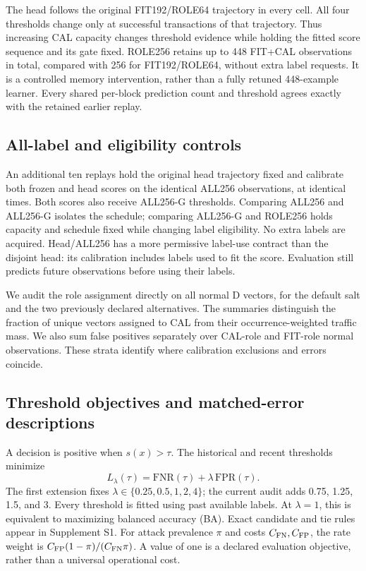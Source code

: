 The head follows the original FIT192/ROLE64 trajectory in every cell. All four thresholds change only at successful transactions of that trajectory. Thus increasing CAL capacity changes threshold evidence while holding the fitted score sequence and its gate fixed. ROLE256 retains up to 448 FIT+CAL observations in total, compared with 256 for FIT192/ROLE64, without extra label requests. It is a controlled memory intervention, rather than a fully retuned 448-example learner. Every shared per-block prediction count and threshold agrees exactly with the retained earlier replay.

\subsection{All-label and eligibility controls}
An additional ten replays hold the original head trajectory fixed and calibrate both frozen and head scores on the identical ALL256 observations, at identical times. Both scores also receive ALL256-G thresholds. Comparing ALL256 and ALL256-G isolates the schedule; comparing ALL256-G and ROLE256 holds capacity and schedule fixed while changing label eligibility. No extra labels are acquired. Head/ALL256 has a more permissive label-use contract than the disjoint head: its calibration includes labels used to fit the score. Evaluation still predicts future observations before using their labels.

We audit the role assignment directly on all normal D vectors, for the default salt and the two previously declared alternatives. The summaries distinguish the fraction of unique vectors assigned to CAL from their occurrence-weighted traffic mass. We also sum false positives separately over CAL-role and FIT-role normal observations. These strata identify where calibration exclusions and errors coincide.

\subsection{Threshold objectives and matched-error descriptions}
A decision is positive when $s(x)>\tau$. The historical and recent thresholds minimize
\begin{equation}
 L_\lambda(\tau)=\mathrm{FNR}(\tau)+\lambda\,\mathrm{FPR}(\tau).
 \label{eq:cost}
\end{equation}
The first extension fixes $\lambda\in\{0.25,0.5,1,2,4\}$; the current audit adds 0.75, 1.25, 1.5, and 3. Every threshold is fitted using past available labels. At $\lambda=1$, this is equivalent to maximizing balanced accuracy (BA). Exact candidate and tie rules appear in Supplement S1. For attack prevalence $\pi$ and costs $C_{\rm FN},C_{\rm FP}$, the rate weight is $C_{\rm FP}(1-\pi)/(C_{\rm FN}\pi)$. A value of one is a declared evaluation objective, rather than a universal operational cost.

